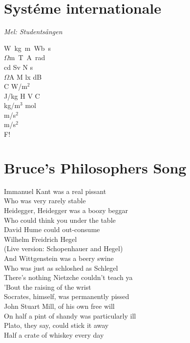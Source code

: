 \documentclass[twoside, openright]{report}
\begin{document}
\section{Systéme internationale}
\textit{Mel: Studentsången}\\

\begin{center}
W\ kg\ m\ Wb\ s\\
$\Omega$m\ T\ A\ rad\\
cd Sv N s\\
$\Omega$A M lx dB\\
\degree C W/m$^2$\\
J/kg H V C\\
kg/m$^3$ mol\\
m/s$^2$\\
m/s$^2$\\
F!
\end{center}

\section{Bruce's Philosophers Song}

Immanuel Kant was a real pissant\\
Who was very rarely stable\\

Heidegger, Heidegger was a boozy beggar\\
Who could think you under the table\\

David Hume could out-consume\\
Wilhelm Freidrich Hegel\\
(Live version: Schopenhauer and Hegel)\\

And Wittgenstein was a beery swine\\
Who was just as schloshed as Schlegel\\

There's nothing Nietzche couldn't teach ya\\
'Bout the raising of the wrist\\
Socrates, himself, was permanently pissed\\

John Stuart Mill, of his own free will\\
On half a pint of shandy was particularly ill\\

Plato, they say, could stick it away\\
Half a crate of whiskey every day\\
\end{document}
